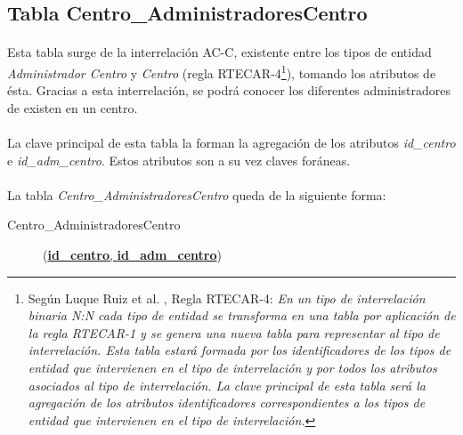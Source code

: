    \subsection{Tabla Centro\_AdministradoresCentro}

      \paragraph{}Esta tabla surge de la interrelación AC-C, existente entre
      los tipos de entidad \textit{Administrador Centro} y \textit{Centro}
      (regla RTECAR-4\footnote{Según Luque Ruiz et al. \cite{luqueRuiz}, Regla
      RTECAR-4: \textit{En un tipo de
      interrelación binaria N:N cada tipo de entidad se transforma en una tabla
      por aplicación de la regla RTECAR-1 y se genera una nueva tabla para
      representar al tipo de interrelación. Esta tabla estará formada por los
      identificadores de los tipos de entidad que intervienen en el tipo
      de interrelación y por todos los atributos asociados al tipo de
      interrelación. La clave principal de esta tabla será la agregación de los
      atributos identificadores correspondientes a los tipos de entidad que
      intervienen en el tipo de interrelación.}}), tomando los atributos de
      ésta. Gracias a esta interrelación, se podrá conocer los diferentes
      administradores de existen en un centro.

      \paragraph{}La clave principal de esta tabla la forman la agregación de
      los atributos \textit{id\_centro} e \textit{id\_adm\_centro}. Estos
      atributos son a su vez claves foráneas.

      \paragraph{}La tabla \textit{Centro\_AdministradoresCentro} queda de la
      siguiente forma:

      \begin{description}
         \item[Centro\_AdministradoresCentro] \begin{flushleft}(\underline{\textbf{id\_centro},
         \textbf{id\_adm\_centro}})\end{flushleft}
      \end{description}